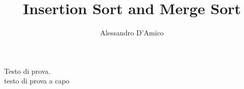 \documentclass{article}
\title {Insertion Sort and Merge Sort}
\author{Alessandro D'Amico}
\begin{document}
	\maketitle
	\newpage
	Testo di prova. \\
	testo di prova a capo
\end{document}
